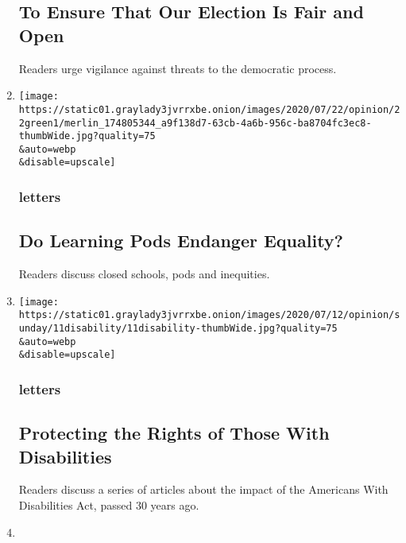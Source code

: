 \begin{enumerate}
  \hypertarget{to-ensure-that-our-election-is-fair-and-open}{%
  \subsection{To Ensure That Our Election Is Fair and
  Open}\label{to-ensure-that-our-election-is-fair-and-open}}

  Readers urge vigilance against threats to the democratic process.
\item
  \href{/2020/08/02/opinion/letters/virus-education.html}{}

  \texttt{[image: https://static01.graylady3jvrrxbe.onion/images/2020/07/22/opinion/22green1/merlin\_174805344\_a9f138d7-63cb-4a6b-956c-ba8704fc3ec8-thumbWide.jpg?quality=75\\\&auto=webp\\\&disable=upscale]}

  \hypertarget{letters-5}{%
  \subsubsection{letters}\label{letters-5}}

  \hypertarget{do-learning-pods-endanger-equality}{%
  \subsection{Do Learning Pods Endanger
  Equality?}\label{do-learning-pods-endanger-equality}}

  Readers discuss closed schools, pods and inequities.
\item
  \href{/2020/08/01/opinion/letters/disability-law.html}{}

  \texttt{[image: https://static01.graylady3jvrrxbe.onion/images/2020/07/12/opinion/sunday/11disability/11disability-thumbWide.jpg?quality=75\\\&auto=webp\\\&disable=upscale]}

  \hypertarget{letters-6}{%
  \subsubsection{letters}\label{letters-6}}

  \hypertarget{protecting-the-rights-of-those-with-disabilities}{%
  \subsection{Protecting the Rights of Those With
  Disabilities}\label{protecting-the-rights-of-those-with-disabilities}}

  Readers discuss a series of articles about the impact of the Americans
  With Disabilities Act, passed 30 years ago.
\item
  \href{/2020/07/31/opinion/letters/coronavirus-economy.html}{}


\end{enumerate}
